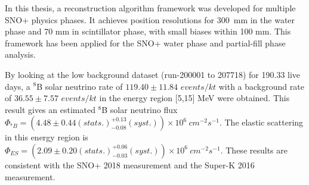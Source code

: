 In this thesis, a reconstruction algorithm framework was developed for multiple SNO+ physics phases. It achieves position resolutions for 300~mm in the water phase and 70 mm in scintillator phase, with small biases within 100 mm. This framework has been applied for the SNO+ water phase and partial-fill phase analysis. 

By looking at the low background dataset (run-200001 to 207718) for 190.33 live days, a $^8$B solar neutrino rate of $119.40\pm11.84$ $events/kt$ with a background rate of $36.55\pm7.57$ $events/kt$ in the energy region [5,15] MeV were obtained. This result gives an estimated $^8$B solar neutrino flux $\Phi_{^8B}=(4.48 \pm 0.44(stats.)^{+0.13}_{-0.08}(syst.))\times10^6~cm^{-2}s^{-1}$. The elastic scattering in this energy region is $\Phi_{ES}=(2.09 \pm 0.20(stats.)^{+0.06}_{-0.03}(syst.))\times10^6~cm^{-2}s^{-1}$. These results are consistent with the SNO+ 2018 measurement\cite{anderson2019measurement} and the Super-K 2016 measurement\cite{abe2016solar}.



